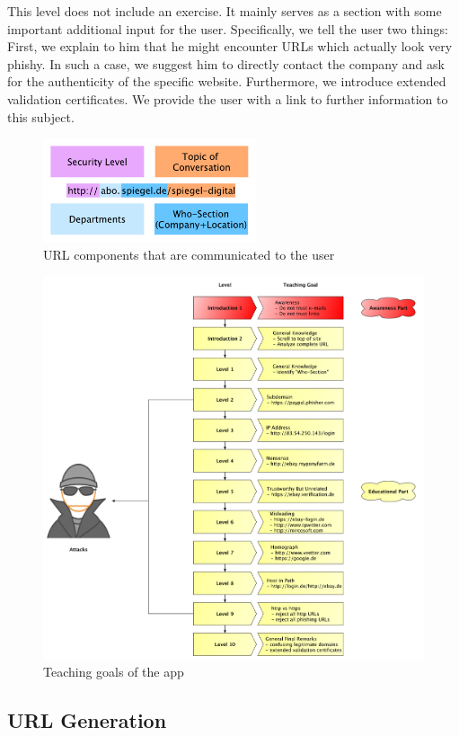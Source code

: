\begin{description}[leftmargin=0cm]
	\item[Level 10] This level does not include an exercise.
 It mainly serves as a section with some important additional input for the user.
 Specifically, we tell the user two things: First, we explain to him that he might encounter URLs which actually look very phishy.
 In such a case, we suggest him to directly contact the company and ask for the authenticity of the specific website.
 Furthermore, we introduce extended validation certificates.
 We provide the user with a link to further information to this subject.

\end{description}

\begin{figure}[hHtbp]
\centering
\includegraphics[width=0.56\textwidth]{graphix/url_components.pdf}
\caption{URL components that are communicated to the user}
\label{fig:url_components}
\end{figure}

\begin{figure}[hHtbp]
\centering
\includegraphics[width=1.0\textwidth]{graphix/level_teaching_goals.pdf}
\caption{Teaching goals of the app}
\label{fig:url_components}
\end{figure}
\subsection{URL Generation}


